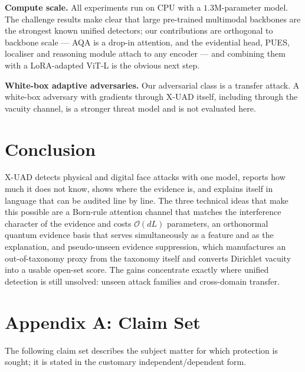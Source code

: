 \documentclass[conference]{IEEEtran}
\begin{document}
\textbf{Compute scale.} All experiments run on CPU with a $1.3$M-parameter model.
The challenge results \cite{ma2025uniattackplus} make clear that large pre-trained
multimodal backbones are the strongest known unified detectors; our contributions
are orthogonal to backbone scale --- AQA is a drop-in attention, and the evidential
head, PUES, localiser and reasoning module attach to any encoder --- and combining
them with a LoRA-adapted ViT-L is the obvious next step.

\textbf{White-box adaptive adversaries.} Our adversarial class is a transfer attack.
A white-box adversary with gradients through X-UAD itself, including through the
vacuity channel, is a stronger threat model and is not evaluated here.

\section{Conclusion}
X-UAD detects physical and digital face attacks with one model, reports how much it
does not know, shows where the evidence is, and explains itself in language that can
be audited line by line. The three technical ideas that make this possible are a
Born-rule attention channel that matches the interference character of the evidence
and costs $\mathcal{O}(dL)$ parameters, an orthonormal quantum evidence basis that
serves simultaneously as a feature and as the explanation, and pseudo-unseen
evidence suppression, which manufactures an out-of-taxonomy proxy from the taxonomy
itself and converts Dirichlet vacuity into a usable open-set score. The gains
concentrate exactly where unified detection is still unsolved: unseen attack
families and cross-domain transfer.

\appendix
\section*{Appendix A: Claim Set}
\small
The following claim set describes the subject matter for which protection is
sought; it is stated in the customary independent/dependent form.
\end{document}
